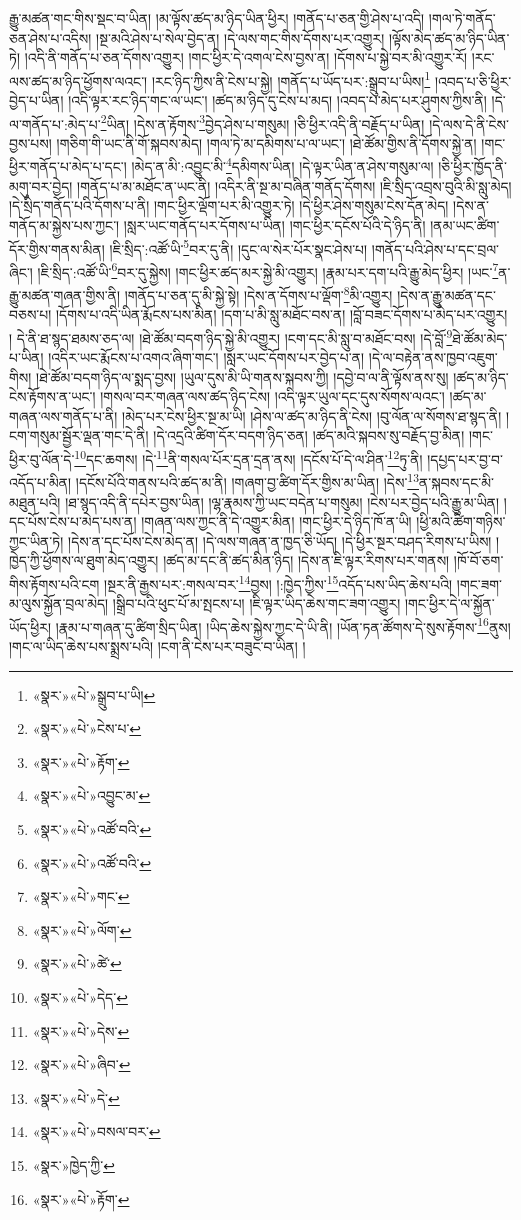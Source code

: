 རྒྱུ་མཚན་གང་གིས་སྡང་བ་ཡིན། །མ་ལྟོས་ཚད་མ་ཉིད་ཡིན་ཕྱིར། །གནོད་པ་ཅན་གྱི་ཤེས་པ་འདི། །གལ་ཏེ་གནོད་ཅན་ཤེས་པ་འདིས། །སྔ་མའི་ཤེས་པ་སེལ་བྱེད་ན། །དེ་ལས་གང་གིས་དོགས་པར་འགྱུར། །ལྟོས་མེད་ཚད་མ་ཉིད་ཡིན་ཏེ། །འདི་ནི་གནོད་པ་ཅན་དོགས་འགྱུར། །གང་ཕྱིར་དེ་འགལ་ངེས་བྱས་ན། །དོགས་པ་སྐྱེ་བར་མི་འགྱུར་རོ། །རང་ལས་ཚད་མ་ཉིད་ཕྱོགས་ལའང་། །རང་ཉིད་ཀྱིས་ནི་ངེས་པ་སྐྱེ། །གནོད་པ་ཡོད་པར་:སྒྲུབ་པ་ཡིས།\footnote{«སྣར་»«པེ་»སྒྲུབ་པ་ཡི།} །འབད་པ་ཅི་ཕྱིར་བྱེད་པ་ཡིན། །འདི་ལྟར་རང་ཉིད་གང་ལ་ཡང་། །ཚད་མ་ཉིད་དུ་ངེས་པ་མད། །འབད་པ་མེད་པར་ཤུགས་ཀྱིས་ནི། །དེ་ལ་གནོད་པ་:མེད་པ་\footnote{«སྣར་»«པེ་»ངེས་པ་}ཡིན། །དེས་ན་རྟོགས་\footnote{«སྣར་»«པེ་»རྟོག་}བྱེད་ཤེས་པ་གསུམ། །ཅི་ཕྱིར་འདི་ནི་བརྗོད་པ་ཡིན། །དེ་ལས་དེ་ནི་ངེས་བྱས་པས། །གཅིག་གི་ཡང་ནི་གོ་སྐབས་མེད། །གལ་ཏེ་མ་དམིགས་པ་ལ་ཡང་། །ཐེ་ཚོམ་གྱིས་ནི་དོགས་སྐྱེ་ན། །གང་ཕྱིར་གནོད་པ་མེད་པ་དང་། །མེད་ན་མི་:འབྱུང་མི་\footnote{«སྣར་»«པེ་»འབྱུང་མ་}དམིགས་ཡིན། །དེ་ལྟར་ཡིན་ན་ཤེས་གསུམ་ལ། །ཅི་ཕྱིར་ཁྱོད་ནི་མགུ་བར་བྱེད། །གནོད་པ་མ་མཐོང་ན་ཡང་ནི། །འདིར་ནི་སྔ་མ་བཞིན་གནོད་དོགས། །ཇི་སྲིད་འབྲས་བུའི་མི་སླུ་མེད། །དེ་སྲིད་གནོད་པའི་དོགས་པ་ནི། །གང་ཕྱིར་ལྡོག་པར་མི་འགྱུར་ཏེ། །དེ་ཕྱིར་ཤེས་གསུམ་ངེས་དོན་མེད། །དེས་ན་གནོད་མ་སྐྱེས་པས་ཀྱང་། །སླར་ཡང་གནོད་པར་དོགས་པ་ཡིན། །གང་ཕྱིར་དངོས་པོའི་དེ་ཉིད་ནི། །ནམ་ཡང་ཚིག་དོར་གྱིས་གནས་མིན། །ཇི་སྲིད་:འཚོ་ཡི་\footnote{«སྣར་»«པེ་»འཚོ་བའི་}བར་དུ་ནི། །དུང་ལ་སེར་པོར་སྣང་ཤེས་པ། །གནོད་པའི་ཤེས་པ་དང་བྲལ་ཞིང་། །ཇི་སྲིད་:འཚོ་ཡི་\footnote{«སྣར་»«པེ་»འཚོ་བའི་}བར་དུ་སྐྱེས། །གང་ཕྱིར་ཚད་མར་སྐྱེ་མི་འགྱུར། །རྣམ་པར་དག་པའི་རྒྱུ་མེད་ཕྱིར། །ཡང་\footnote{«སྣར་»«པེ་»གང་}ན་རྒྱུ་མཚན་གཞན་གྱིས་ནི། །གནོད་པ་ཅན་དུ་མི་སྐྱེ་སྟེ། །དེས་ན་དོགས་པ་ལྡོག་\footnote{«སྣར་»«པེ་»ལོག་}མི་འགྱུར། །དེས་ན་རྒྱུ་མཚན་དང་བཅས་པ། །དོགས་པ་འདི་ཡིན་རྨོངས་པས་མིན། །དག་པ་མི་སླུ་མཐོང་བས་ན། །བློ་བཟང་དོགས་པ་མེད་པར་འགྱུར། །
དེ་ནི་ཐ་སྙད་ཐམས་ཅད་ལ། །ཐེ་ཚོམ་བདག་ཉིད་སྐྱེ་མི་འགྱུར། །ངག་དང་མི་སླུ་བ་མཐོང་བས། །དེ་བློ་\footnote{«སྣར་»«པེ་»ཚེ་}ཐེ་ཚོམ་མེད་པ་ཡིན། །འདིར་ཡང་རྨོངས་པ་འགའ་ཞིག་གང་། །སླར་ཡང་དོགས་པར་བྱེད་པ་ན། །དེ་ལ་བརྟེན་ནས་ཁྱབ་འཇུག་གིས། །ཐེ་ཚོམ་བདག་ཉིད་ལ་སྨད་བྱས། །ཡུལ་དུས་མི་ཡི་གནས་སྐབས་ཀྱི། །དབྱེ་བ་ལ་ནི་ལྟོས་ནས་སུ། །ཚད་མ་ཉིད་ངེས་རྟོགས་ན་ཡང་། །གསལ་བར་གཞན་ལས་ཚད་ཉིད་ངེས། །འདི་ལྟར་ཡུལ་དང་དུས་སོགས་ལའང་། །ཚད་མ་གཞན་ལས་གནོད་པ་ནི། །མེད་པར་ངེས་ཕྱིར་སྔ་མ་ཡི། །ཤེས་ལ་ཚད་མ་ཉིད་ནི་ངེས། །བུ་ལོན་ལ་སོགས་ཐ་སྙད་ནི། །ངག་གསུམ་སྦྱོར་ལྡན་གང་དེ་ནི། །དེ་འདྲའི་ཚིག་དོར་བདག་ཉིད་ཅན། །ཚད་མའི་སྐབས་སུ་བརྗོད་བྱ་མིན། །གང་ཕྱིར་བུ་ལོན་དེ་\footnote{«སྣར་»«པེ་»དེད་}དང་ཆགས། །དེ་\footnote{«སྣར་»«པེ་»དེས་}ནི་གསལ་པོར་དྲན་དྲན་ནས། །དངོས་པོ་དེ་ལ་ཤིན་\footnote{«སྣར་»«པེ་»ཞིབ་}ཏུ་ནི། །དཔྱད་པར་བྱ་བ་འདོད་པ་མིན། །དངོས་པོའི་གནས་པའི་ཚད་མ་ནི། །གཞག་བྱ་ཚིག་དོར་གྱིས་མ་ཡིན། །དེས་\footnote{«སྣར་»«པེ་»དེ་}ན་སྐབས་དང་མི་མཐུན་པའི། །ཐ་སྙད་འདི་ནི་དཔེར་བྱས་ཡིན། །ལྷ་རྣམས་ཀྱི་ཡང་བདེན་པ་གསུམ། །ངེས་པར་བྱེད་པའི་རྒྱུ་མ་ཡིན། །དང་པོས་ངེས་པ་མེད་པས་ན། །གཞན་ལས་ཀྱང་ནི་དེ་འགྱུར་མིན། །གང་ཕྱིར་དེ་ཉིད་ཁོ་ན་ཡི། །ཕྱི་མའི་ཚིག་གཉིས་ཀྱང་ཡིན་ཏེ། །དེས་ན་དང་པོས་ངེས་མེད་ན། །དེ་ལས་གཞན་ན་ཁྱད་ཅི་ཡོད། །དེ་ཕྱིར་སྔར་བཤད་རིགས་པ་ཡིས། །ཁྱེད་ཀྱི་ཕྱོགས་ལ་ཐུག་མེད་འགྱུར། །ཚད་མ་དང་ནི་ཚད་མིན་ཉིད། །དེས་ན་ཇི་ལྟར་རིགས་པར་གནས། །ཁོ་བོ་ཅག་གིས་རྟོགས་པའི་ངག །སྔར་ནི་རྒྱས་པར་:གསལ་བར་\footnote{«སྣར་»«པེ་»བསལ་བར་}བྱས། །:ཁྱེད་ཀྱིས་\footnote{«སྣར་»ཁྱེད་ཀྱི་}འདོད་པས་ཡིད་ཆེས་པའི། །གང་ཟག་མ་ལུས་སྐྱོན་བྲལ་མེད། །སྒྲིབ་པའི་ཕུང་པོ་མ་སྤངས་པ། །ཇི་ལྟར་ཡིད་ཆེས་གང་ཟག་འགྱུར། །གང་ཕྱིར་དེ་ལ་སྐྱོན་ཡོད་ཕྱིར། །རྣམ་པ་གཞན་དུ་ཚིག་སྲིད་ཡིན། །ཡིད་ཆེས་སྐྱེས་ཀྱང་དེ་ཡི་ནི། །ཡོན་ཏན་ཚོགས་དེ་སུས་རྟོགས་\footnote{«སྣར་»«པེ་»རྟོག་}ནུས། །གང་ལ་ཡིད་ཆེས་པས་སྨྲས་པའི། །ངག་ནི་ངེས་པར་བཟུང་བ་ཡིན། །
